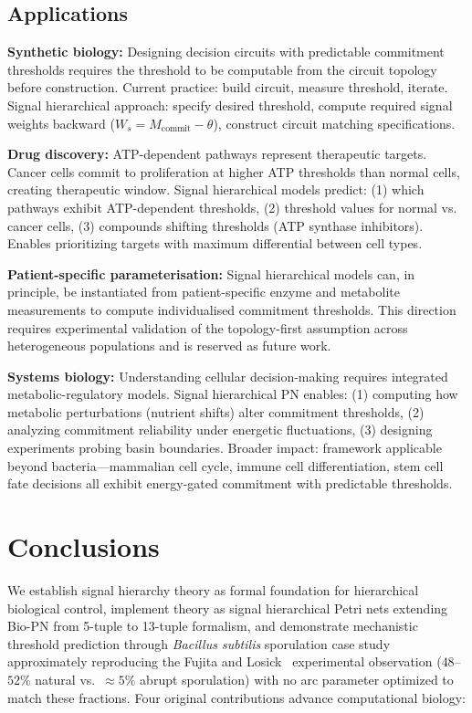 \documentclass[10pt,letterpaper]{article}
\begin{document}
\subsection{Applications}

\textbf{Synthetic biology:} Designing decision circuits with predictable commitment thresholds requires the threshold to be computable from the circuit topology before construction. Current practice: build circuit, measure threshold, iterate. Signal hierarchical approach: specify desired threshold, compute required signal weights backward ($W_s = M_{\text{commit}} - \theta$), construct circuit matching specifications.

\textbf{Drug discovery:} ATP-dependent pathways represent therapeutic targets. Cancer cells commit to proliferation at higher ATP thresholds than normal cells, creating therapeutic window. Signal hierarchical models predict: (1) which pathways exhibit ATP-dependent thresholds, (2) threshold values for normal vs. cancer cells, (3) compounds shifting thresholds (ATP synthase inhibitors). Enables prioritizing targets with maximum differential between cell types.

\textbf{Patient-specific parameterisation:} Signal hierarchical models can, in principle, be instantiated from patient-specific enzyme and metabolite measurements to compute individualised commitment thresholds. This direction requires experimental validation of the topology-first assumption across heterogeneous populations and is reserved as future work.

\textbf{Systems biology:} Understanding cellular decision-making requires integrated metabolic-regulatory models. Signal hierarchical PN enables: (1) computing how metabolic perturbations (nutrient shifts) alter commitment thresholds, (2) analyzing commitment reliability under energetic fluctuations, (3) designing experiments probing basin boundaries. Broader impact: framework applicable beyond bacteria---mammalian cell cycle, immune cell differentiation, stem cell fate decisions all exhibit energy-gated commitment with predictable thresholds.

\section{Conclusions}

We establish signal hierarchy theory as formal foundation for hierarchical biological control, implement theory as signal hierarchical Petri nets extending Bio-PN from 5-tuple to 13-tuple formalism, and demonstrate mechanistic threshold prediction through \textit{Bacillus subtilis} sporulation case study approximately reproducing the Fujita and Losick~\cite{fujita2005} experimental observation ($48$--$52\%$ natural vs.\ $\approx 5\%$ abrupt sporulation) with no arc parameter optimized to match these fractions. Four original contributions advance computational biology:
\end{document}
